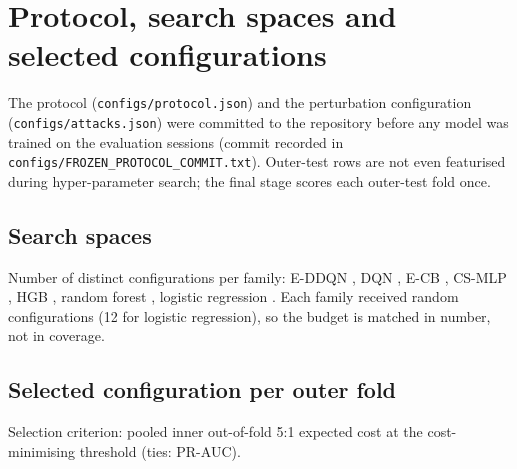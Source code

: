 \section{Protocol, search spaces and selected configurations}
\label{sec:s-protocol}
The protocol (\texttt{configs/\allowbreak protocol.json}) and the perturbation configuration (\texttt{configs/\allowbreak attacks.json}) were committed to the repository before any model was trained on the evaluation sessions (commit recorded in \texttt{configs/\allowbreak FROZEN\_PROTOCOL\_COMMIT.txt}). Outer-test rows are not even featurised during hyper-parameter search; the final stage scores each outer-test fold once.

\subsection{Search spaces}
{\footnotesize}

Number of distinct configurations per family: E-DDQN \PHSpaceEDDQN, DQN \PHSpaceDQN, E-CB \PHSpaceECB, CS-MLP \PHSpaceCSMLP, HGB \PHSpaceHGB, random forest \PHSpaceRF, logistic regression \PHSpaceLR. Each family received \HPOBudget{} random configurations (12 for logistic regression), so the budget is matched in number, not in coverage.

\subsection{Selected configuration per outer fold}
Selection criterion: pooled inner out-of-fold 5:1 expected cost at the cost-minimising threshold (ties: PR-AUC).
{\footnotesize}

